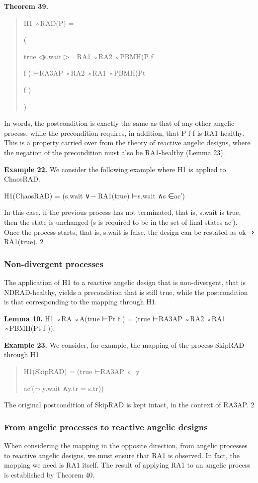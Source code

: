 \documentclass[11pt]{article}
\begin{document}
\noindent\textbf{Theorem 39.}


\begin{quote}\small\raggedright
H1 ◦RAD(P) =
\par
(
\par
true ◁s.wait ▷¬ RA1 ◦RA2 ◦PBMH(P f
\par
f ) ⊢RA3AP ◦RA2 ◦RA1 ◦PBMH(Pt
\par
f )
\par
)
\end{quote}

In words, the postcondition is exactly the same as that of any other angelic process, while the precondition requires, in addition, that P f f is RA1-healthy. This is a property carried over from the theory of reactive angelic designs, where the negation of the precondition must also be RA1-healthy (Lemma 23).

\noindent\textbf{Example 22.} We consider the following example where H1 is applied to ChaosRAD.


H1(ChaosRAD) = (s.wait ∨¬ RA1(true) ⊢s.wait ∧s ∈ac′)

In this case, if the previous process has not terminated, that is, s.wait is true, then the state is unchanged (s is required to be in the set of final states ac′). Once the process starts, that is, s.wait is false, the design can be restated as ok ⇒ RA1(true). 2

\subsubsection{Non-divergent processes}
The application of H1 to a reactive angelic design that is non-divergent, that is NDRAD-healthy, yields a precondition that is still true, while the postcondition is that corresponding to the mapping through H1.

\noindent\textbf{Lemma 10.} H1 ◦RA ◦A(true ⊢Pt f ) = (true ⊢RA3AP ◦RA2 ◦RA1 ◦PBMH(Pt f )).


\noindent\textbf{Example 23.} We consider, for example, the mapping of the process SkipRAD through H1.


\begin{quote}\small\raggedright
H1(SkipRAD) = (true ⊢RA3AP ◦∈⃝y
\par
ac′(¬ y.wait ∧y.tr = s.tr))
\end{quote}

The original postcondition of SkipRAD is kept intact, in the context of RA3AP. 2

\subsubsection{From angelic processes to reactive angelic designs}
When considering the mapping in the opposite direction, from angelic processes to reactive angelic designs, we must ensure that RA1 is observed. In fact, the mapping we need is RA1 itself. The result of applying RA1 to an angelic process is established by Theorem 40.
\end{document}
